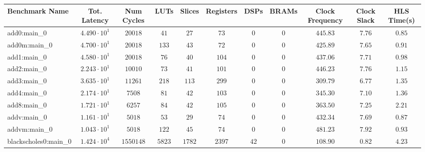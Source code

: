 \begin{tabular}{|l|c|c|c|c|c|c|c|c|c|c|}
\hline
Benchmark Name                 & Tot. Latency           & Num Cycles   & LUTs       & Slices     & Registers  & DSPs     & BRAMs    & Clock Frequency & Clock Slack & HLS Time(s) \\
\hline
add0:main\_0                   & $ 4.490 \cdot 10^{1} $ & $ 20018    $ & $ 41     $ & $ 27     $ & $ 73     $ & $ 0    $ & $ 0    $ & $ 445.83      $ & $ 7.76    $ & $ 0.85    $ \\
add0m:main\_0                  & $ 4.700 \cdot 10^{1} $ & $ 20018    $ & $ 133    $ & $ 43     $ & $ 72     $ & $ 0    $ & $ 0    $ & $ 425.89      $ & $ 7.65    $ & $ 0.91    $ \\
add1:main\_0                   & $ 4.580 \cdot 10^{1} $ & $ 20018    $ & $ 76     $ & $ 40     $ & $ 104    $ & $ 0    $ & $ 0    $ & $ 437.06      $ & $ 7.71    $ & $ 0.98    $ \\
add2:main\_0                   & $ 2.243 \cdot 10^{1} $ & $ 10010    $ & $ 73     $ & $ 41     $ & $ 101    $ & $ 0    $ & $ 0    $ & $ 446.23      $ & $ 7.76    $ & $ 1.15    $ \\
add3:main\_0                   & $ 3.635 \cdot 10^{1} $ & $ 11261    $ & $ 218    $ & $ 113    $ & $ 299    $ & $ 0    $ & $ 0    $ & $ 309.79      $ & $ 6.77    $ & $ 1.35    $ \\
add4:main\_0                   & $ 2.174 \cdot 10^{1} $ & $ 7508     $ & $ 81     $ & $ 42     $ & $ 103    $ & $ 0    $ & $ 0    $ & $ 345.30      $ & $ 7.10    $ & $ 1.36    $ \\
add8:main\_0                   & $ 1.721 \cdot 10^{1} $ & $ 6257     $ & $ 84     $ & $ 42     $ & $ 105    $ & $ 0    $ & $ 0    $ & $ 363.50      $ & $ 7.25    $ & $ 2.21    $ \\
addv:main\_0                   & $ 1.161 \cdot 10^{1} $ & $ 5018     $ & $ 53     $ & $ 29     $ & $ 74     $ & $ 0    $ & $ 0    $ & $ 432.34      $ & $ 7.69    $ & $ 0.87    $ \\
addvm:main\_0                  & $ 1.043 \cdot 10^{1} $ & $ 5018     $ & $ 122    $ & $ 45     $ & $ 74     $ & $ 0    $ & $ 0    $ & $ 481.23      $ & $ 7.92    $ & $ 0.93    $ \\
blackscholes0:main\_0          & $ 1.424 \cdot 10^{4} $ & $ 1550148  $ & $ 5823   $ & $ 1782   $ & $ 2397   $ & $ 42   $ & $ 0    $ & $ 108.90      $ & $ 0.82    $ & $ 4.23    $ \\

\end{tabular}

